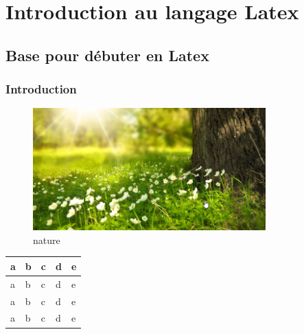 \documentclass{report}
\begin{document}
\tableofcontents
\part{Introduction au langage Latex}
\chapter{Base pour débuter en Latex}
\section{Introduction}
\lipsum[1-2]
\begin{figure}
    \centering
    \includegraphics[width=0.8\textwidth]{nature.png}
    \caption{nature}
\end{figure}

\begin{table}
    \centering
    \begin{tabular}{|l|l|l|l|l|}
        \hline
        a & b & c & d & e \\
        \hline
        a & b & c & d & e \\
        \hline
        a & b & c & d & e \\
        \hline
        a & b & c & d & e \\
        \hline
    \end{tabular}
\end{table}
\end{document}
